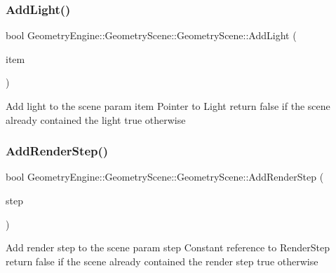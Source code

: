 \subsubsection{\texorpdfstring{AddLight()}{AddLight()}}
{\footnotesize\ttfamily bool Geometry\+Engine\+::\+Geometry\+Scene\+::\+Geometry\+Scene\+::\+Add\+Light (\begin{DoxyParamCaption}\item[{\mbox{\hyperlink{class_geometry_engine_1_1_geometry_world_item_1_1_geometry_light_1_1_light}{Geometry\+World\+Item\+::\+Geometry\+Light\+::\+Light}} $\ast$}]{item }\end{DoxyParamCaption})\hspace{0.3cm}{\ttfamily [virtual]}}

Add light to the scene param item Pointer to Light return false if the scene already contained the light true otherwise \mbox{\label{class_geometry_engine_1_1_geometry_scene_1_1_geometry_scene_ada6f2a88a6e7962200a12e5083f8c055}} 
\subsubsection{\texorpdfstring{AddRenderStep()}{AddRenderStep()}}
{\footnotesize\ttfamily bool Geometry\+Engine\+::\+Geometry\+Scene\+::\+Geometry\+Scene\+::\+Add\+Render\+Step (\begin{DoxyParamCaption}\item[{const \mbox{\hyperlink{class_geometry_engine_1_1_geometry_render_step_1_1_render_step}{Geometry\+Render\+Step\+::\+Render\+Step}} \&}]{step }\end{DoxyParamCaption})\hspace{0.3cm}{\ttfamily [virtual]}}

Add render step to the scene param step Constant reference to Render\+Step return false if the scene already contained the render step true otherwise \mbox{\label{class_geometry_engine_1_1_geometry_scene_1_1_geometry_scene_aed4a5446836e0430fb1a295f760062f6}} 
